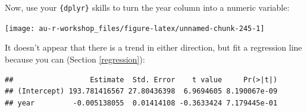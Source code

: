 \documentclass[]{book}
\newenvironment{Shaded}{\begin{snugshade}}{\end{snugshade}}
\newcommand{\KeywordTok}[1]{\textcolor[rgb]{0.13,0.29,0.53}{\textbf{#1}}}
\newcommand{\DataTypeTok}[1]{\textcolor[rgb]{0.13,0.29,0.53}{#1}}
\newcommand{\DecValTok}[1]{\textcolor[rgb]{0.00,0.00,0.81}{#1}}
\newcommand{\StringTok}[1]{\textcolor[rgb]{0.31,0.60,0.02}{#1}}
\newcommand{\CommentTok}[1]{\textcolor[rgb]{0.56,0.35,0.01}{\textit{#1}}}
\newcommand{\OperatorTok}[1]{\textcolor[rgb]{0.81,0.36,0.00}{\textbf{#1}}}
\newcommand{\NormalTok}[1]{#1}
\theoremstyle{definition}
\theoremstyle{definition}
\theoremstyle{definition}
\theoremstyle{remark}
\begin{document}
Now, use your \texttt{\{dplyr\}} skills to turn the year column into a
numeric variable:

\begin{Shaded}
\end{Shaded}

\begin{center}\texttt{[image: au-r-workshop\_files/figure-latex/unnamed-chunk-245-1]} \end{center}

It doesn't appear that there is a trend in either direction, but fit a
regression line because you can (Section \ref{regression}):

\begin{Shaded}
\end{Shaded}

\begin{verbatim}
##                  Estimate  Std. Error    t value     Pr(>|t|)
## (Intercept) 193.781416567 27.80436398  6.9694605 8.190067e-09
## year         -0.005138055  0.01414108 -0.3633424 7.179445e-01
\end{verbatim}
\end{document}
